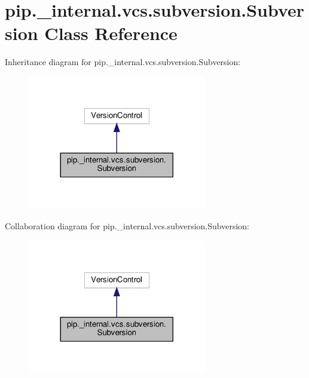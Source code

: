 \hypertarget{classpip_1_1__internal_1_1vcs_1_1subversion_1_1Subversion}{}\section{pip.\+\_\+internal.\+vcs.\+subversion.\+Subversion Class Reference}
\label{classpip_1_1__internal_1_1vcs_1_1subversion_1_1Subversion}


Inheritance diagram for pip.\+\_\+internal.\+vcs.\+subversion.\+Subversion\+:
\nopagebreak
\begin{figure}[H]
\begin{center}
\leavevmode
\includegraphics[width=221pt]{classpip_1_1__internal_1_1vcs_1_1subversion_1_1Subversion__inherit__graph}
\end{center}
\end{figure}


Collaboration diagram for pip.\+\_\+internal.\+vcs.\+subversion.\+Subversion\+:
\nopagebreak
\begin{figure}[H]
\begin{center}
\leavevmode
\includegraphics[width=221pt]{classpip_1_1__internal_1_1vcs_1_1subversion_1_1Subversion__coll__graph}
\end{center}
\end{figure}
